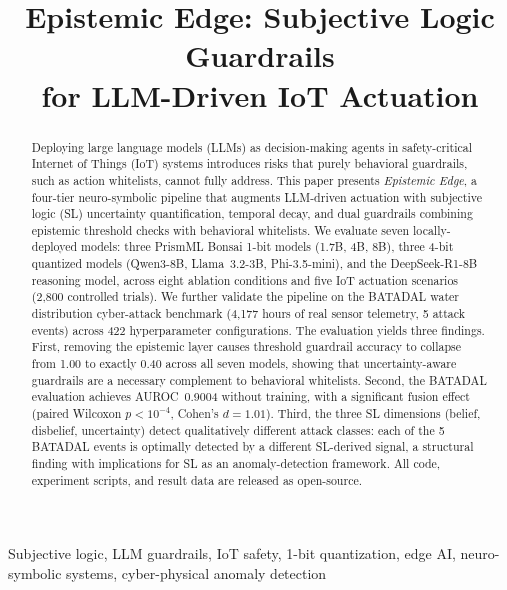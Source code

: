 \documentclass[conference]{IEEEtran}
\begin{document}
\title{Epistemic Edge: Subjective Logic Guardrails\\for LLM-Driven IoT Actuation}


\maketitle

\begin{abstract}
Deploying large language models (LLMs) as decision-making agents in safety-critical Internet of Things (IoT) systems introduces risks that purely behavioral guardrails, such as action whitelists, cannot fully address.
This paper presents \textit{Epistemic Edge}, a four-tier neuro-symbolic pipeline that augments LLM-driven actuation with subjective logic (SL) uncertainty quantification, temporal decay, and dual guardrails combining epistemic threshold checks with behavioral whitelists.
We evaluate seven locally-deployed models: three PrismML Bonsai 1-bit models (1.7B, 4B, 8B), three 4-bit quantized models (Qwen3-8B, Llama~3.2-3B, Phi-3.5-mini), and the DeepSeek-R1-8B reasoning model, across eight ablation conditions and five IoT actuation scenarios (2{,}800 controlled trials).
We further validate the pipeline on the BATADAL water distribution cyber-attack benchmark (4{,}177 hours of real sensor telemetry, 5 attack events) across 422 hyperparameter configurations.
The evaluation yields three findings.
First, removing the epistemic layer causes threshold guardrail accuracy to collapse from 1.00 to exactly 0.40 across all seven models, showing that uncertainty-aware guardrails are a necessary complement to behavioral whitelists.
Second, the BATADAL evaluation achieves AUROC~0.9004 without training, with a significant fusion effect (paired Wilcoxon $p<10^{-4}$, Cohen's $d{=}1.01$).
Third, the three SL dimensions (belief, disbelief, uncertainty) detect qualitatively different attack classes: each of the 5 BATADAL events is optimally detected by a different SL-derived signal, a structural finding with implications for SL as an anomaly-detection framework.
All code, experiment scripts, and result data are released as open-source.
\end{abstract}

\begin{IEEEkeywords}
Subjective logic, LLM guardrails, IoT safety, 1-bit quantization, edge AI, neuro-symbolic systems, cyber-physical anomaly detection
\end{IEEEkeywords}
\end{document}
